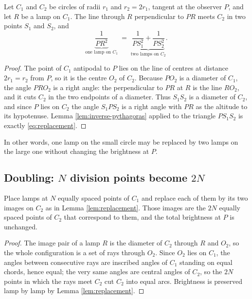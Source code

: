 \begin{lemma}[replacement]\label{lem:replacement}
Let $C_{1}$ and $C_{2}$ be circles of radii $r_{1}$ and $r_{2}=2r_{1}$, tangent at the
observer $P$, and let $R$ be a lamp on $C_{1}$. The line through $R$ perpendicular to $PR$
meets $C_{2}$ in two points $S_{1}$ and $S_{2}$, and
\begin{equation}
  \underbrace{\frac{1}{PR^{2}}}_{\text{one lamp on }C_{1}}
  \;=\;
  \underbrace{\frac{1}{PS_{1}^{2}}+\frac{1}{PS_{2}^{2}}}_{\text{two lamps on }C_{2}}.
  \label{eq:replacement}
\end{equation}
\end{lemma}

\begin{proof}
The point of $C_{1}$ antipodal to $P$ lies on the line of centres at distance
$2r_{1}=r_{2}$ from $P$, so it is the centre $O_{2}$ of $C_{2}$. Because $PO_{2}$ is a
diameter of $C_{1}$, the angle $PRO_{2}$ is a right angle: the perpendicular to $PR$ at $R$
is the line $RO_{2}$, and it cuts $C_{2}$ in the two endpoints of a diameter. Thus $S_{1}S_{2}$
is a diameter of $C_{2}$, and since $P$ lies on $C_{2}$ the angle $S_{1}PS_{2}$ is a right
angle with $PR$ as the altitude to its hypotenuse. Lemma
\ref{lem:inverse-pythagoras} applied to the triangle $PS_{1}S_{2}$ is exactly
\eqref{eq:replacement}.
\end{proof}

In other words, one lamp on the small circle may be replaced by two lamps on the large one
without changing the brightness at $P$.

\subsection{Doubling: $N$ division points become $2N$}

\begin{lemma}[doubling]\label{lem:doubling}
Place lamps at $N$ equally spaced points of $C_{1}$ and replace each of them by its two
images on $C_{2}$ as in Lemma \ref{lem:replacement}. Those images are the $2N$ equally spaced
points of $C_{2}$ that correspond to them, and the total brightness at $P$ is unchanged.
\end{lemma}

\begin{proof}
The image pair of a lamp $R$ is the diameter of $C_{2}$ through $R$ and $O_{2}$, so the whole
configuration is a set of rays through $O_{2}$. Since $O_{2}$ lies on $C_{1}$, the angles
between consecutive rays are inscribed angles of $C_{1}$ standing on equal chords, hence
equal; the very same angles are central angles of $C_{2}$, so the $2N$ points in which the
rays meet $C_{2}$ cut $C_{2}$ into equal arcs. Brightness is preserved lamp by lamp by
Lemma \ref{lem:replacement}.
\end{proof}

